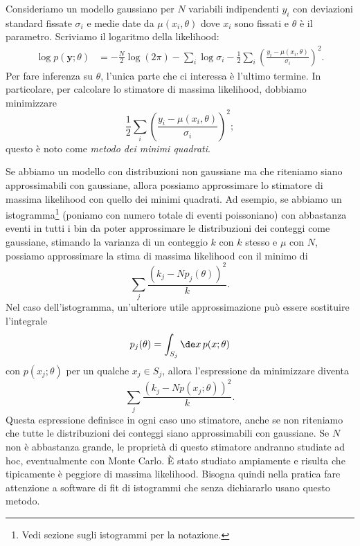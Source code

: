 Consideriamo un modello gaussiano per $N$ variabili indipendenti $y_i$
con deviazioni standard fissate $\sigma_i$
e medie date da $\mu(x_i,\theta)$ dove $x_i$ sono fissati e $\theta$ è il parametro.
Scriviamo il logaritmo della likelihood:
\begin{align*}
	\log p(\mathbf y;\theta)
	&= -\frac N2\log(2\pi)
	- \sum_i\log\sigma_i
	- \frac12 \sum_i \left( \frac{y_i - \mu(x_i,\theta)}{\sigma_i} \right)^2.
\end{align*}
Per fare inferenza su $\theta$, l'unica parte che ci interessa è l'ultimo termine.
In particolare, per calcolare lo stimatore di massima likelihood, dobbiamo minimizzare
\begin{equation*}
	\frac12 \sum_i \left( \frac{y_i - \mu(x_i,\theta)}{\sigma_i} \right)^2;
\end{equation*}
questo è noto come \emph{metodo dei minimi quadrati}.

Se abbiamo un modello con distribuzioni non gaussiane ma che riteniamo siano approssimabili con gaussiane,
allora possiamo approssimare lo stimatore di massima likelihood con quello dei minimi quadrati.
Ad esempio, se abbiamo un istogramma\footnote{Vedi sezione sugli istogrammi per la notazione.}
(poniamo con numero totale di eventi poissoniano)
con abbastanza eventi in tutti i bin da poter approssimare le distribuzioni dei conteggi come gaussiane,
stimando la varianza di un conteggio $k$ con $k$ stesso e $\mu$ con $N$,
possiamo approssimare la stima di massima likelihood con il minimo di
\begin{equation*}
	\sum_j \frac{(k_j - Np_j(\theta))^2}{k}.
\end{equation*}
Nel caso dell'istogramma, un'ulteriore utile approssimazione può essere sostituire l'integrale
\begin{equation*}
	p_j(\theta) = \int_{S_j} \de x\, p(x;\theta)
\end{equation*}
con $p(x_j;\theta)$ per un qualche $x_j\in S_j$, allora l'espressione da minimizzare diventa
\begin{equation*}
	\sum_j \frac{(k_j - Np(x_j;\theta))^2}{k}.
\end{equation*}
Questa espressione definisce in ogni caso uno stimatore,
anche se non riteniamo che tutte le distribuzioni dei conteggi siano approssimabili con gaussiane.
Se $N$ non è abbastanza grande, le proprietà di questo stimatore andranno studiate ad hoc,
eventualmente con Monte Carlo.
È stato studiato ampiamente e risulta che tipicamente è peggiore di massima likelihood.
Bisogna quindi nella pratica fare attenzione a software di fit di istogrammi che senza dichiararlo usano questo metodo.

